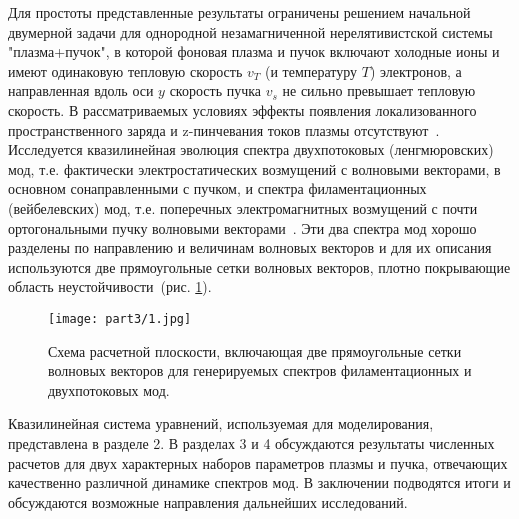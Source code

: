 Для простоты представленные результаты ограничены решением начальной двумерной задачи для однородной незамагниченной нерелятивистской системы "плазма+пучок", в которой фоновая плазма и пучок включают холодные ионы и имеют одинаковую тепловую скорость $v_T$ (и температуру $T$) электронов, а направленная вдоль оси $y$ скорость пучка $v_s$ не сильно превышает тепловую скорость. В рассматриваемых условиях эффекты появления локализованного пространственного заряда и z-пинчевания токов плазмы отсутствуют~\cite{Tzoufras2006,Hao2008,Kocharovsky2024,Garasev2022}. Исследуется квазилинейная эволюция спектра  двухпотоковых (ленгмюровских) мод, т.е. фактически электростатических возмущений с волновыми векторами, в основном сонаправленными с пучком, и спектра филаментационных (вейбелевских) мод, т.е. поперечных электромагнитных возмущений с почти ортогональными пучку волновыми векторами~\cite{Bret2004,Bret2010}. Эти два спектра мод хорошо разделены по направлению и величинам волновых векторов и для их описания используются две прямоугольные сетки волновых векторов, плотно покрывающие область неустойчивости~(рис. \ref{fig:1}).  
\begin{figure}[h]

\texttt{[image: part3/1.jpg]}
\caption{Схема расчетной плоскости, включающая две прямоугольные сетки волновых векторов для генерируемых спектров филаментационных и двухпотоковых мод.}
\label{fig:1}
\end{figure}

Квазилинейная система уравнений, используемая для моделирования, представлена в разделе 2. В разделах 3 и 4 обсуждаются результаты численных расчетов для двух характерных наборов параметров плазмы и пучка, отвечающих качественно различной динамике спектров мод. В заключении подводятся итоги и обсуждаются возможные направления дальнейших исследований.



